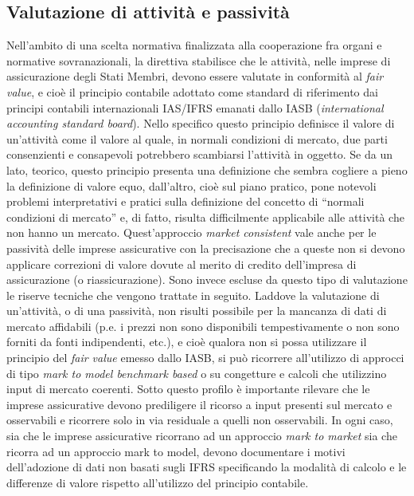 \subsection{Valutazione di attività e passività}
\label{subs:attepass}
Nell’ambito di una scelta normativa finalizzata alla cooperazione fra organi e normative sovranazionali, la direttiva stabilisce che le attività, nelle imprese di assicurazione degli Stati Membri, devono essere valutate in conformità al {\itshape fair value}, e cioè il principio contabile adottato come standard di riferimento dai principi contabili internazionali IAS/IFRS emanati dallo IASB ({\itshape international accounting standard board}).
Nello specifico questo principio definisce il valore di un’attività come il valore al quale, in normali condizioni di mercato, due parti consenzienti e consapevoli potrebbero scambiarsi l’attività in oggetto.
Se da un lato, teorico, questo principio presenta una definizione che sembra cogliere a pieno la definizione di valore equo, dall’altro, cioè sul piano pratico, pone notevoli problemi interpretativi e pratici sulla definizione del concetto di “normali condizioni di mercato” e, di fatto, risulta difficilmente applicabile alle attività che non hanno un mercato.
Quest’approccio {\itshape market consistent} vale anche per le passività delle imprese assicurative con la precisazione che a queste non si devono applicare correzioni di valore dovute al merito di credito dell’impresa di assicurazione (o riassicurazione). Sono invece escluse da questo tipo di valutazione le riserve tecniche che vengono trattate in seguito.
Laddove la valutazione di un’attività, o di una passività, non risulti possibile per la mancanza di dati di mercato affidabili (p.e. i prezzi non sono disponibili tempestivamente o non sono forniti da fonti indipendenti, etc.), e cioè qualora non si possa utilizzare il principio del {\itshape fair value} emesso dallo IASB, si può ricorrere all’utilizzo di approcci di tipo {\itshape mark to model benchmark based} o su congetture e calcoli che utilizzino input di mercato coerenti. Sotto questo profilo è importante rilevare che le imprese assicurative devono prediligere il ricorso a input presenti sul mercato e osservabili e ricorrere solo in via residuale a quelli non osservabili.
In ogni caso, sia che le imprese assicurative ricorrano ad un approccio {\itshape mark to market} sia che ricorra ad un approccio mark to model, devono documentare i motivi dell’adozione di dati non basati sugli IFRS specificando la modalità di calcolo e le differenze di valore rispetto all’utilizzo del principio contabile.

